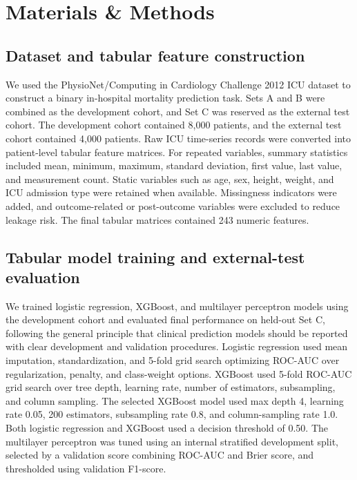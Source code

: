 \documentclass[10pt,twocolumn,letterpaper]{article}
\begin{document}
\section{Materials \& Methods}

\subsection{Dataset and tabular feature construction}

We used the PhysioNet/Computing in Cardiology Challenge 2012 ICU dataset to construct a binary in-hospital mortality prediction task. Sets A and B were combined as the development cohort, and Set C was reserved as the external test cohort. The development cohort contained 8,000 patients, and the external test cohort contained 4,000 patients. Raw ICU time-series records were converted into patient-level tabular feature matrices. For repeated variables, summary statistics included mean, minimum, maximum, standard deviation, first value, last value, and measurement count. Static variables such as age, sex, height, weight, and ICU admission type were retained when available. Missingness indicators were added, and outcome-related or post-outcome variables were excluded to reduce leakage risk. The final tabular matrices contained 243 numeric features.

\subsection{Tabular model training and external-test evaluation}

We trained logistic regression, XGBoost, and multilayer perceptron models using the development cohort and evaluated final performance on held-out Set C, following the general principle that clinical prediction models should be reported with clear development and validation procedures\cite{collins2015tripod}. Logistic regression used mean imputation, standardization, and 5-fold grid search optimizing ROC-AUC over regularization, penalty, and class-weight options. XGBoost used 5-fold ROC-AUC grid search over tree depth, learning rate, number of estimators, subsampling, and column sampling. The selected XGBoost model used max depth 4, learning rate 0.05, 200 estimators, subsampling rate 0.8, and column-sampling rate 1.0. Both logistic regression and XGBoost used a decision threshold of 0.50. The multilayer perceptron was tuned using an internal stratified development split, selected by a validation score combining ROC-AUC and Brier score, and thresholded using validation F1-score.
\end{document}
